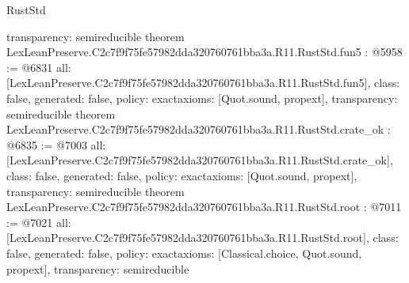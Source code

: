 \begin{lexlean}{RustStd}
\begin{coremodule}
{  transparency: semireducible
}
theorem LexLeanPreserve.C2c7f9f75fe57982dda320760761bba3a.R11.RustStd.fun5 : @5958 := @6831 {
  all: [LexLeanPreserve.C2c7f9f75fe57982dda320760761bba3a.R11.RustStd.fun5],
  class: false,
  generated: false,
  policy: exact{axioms: [Quot.sound, propext]},
  transparency: semireducible
}
theorem LexLeanPreserve.C2c7f9f75fe57982dda320760761bba3a.R11.RustStd.crate_ok : @6835 := @7003 {
  all: [LexLeanPreserve.C2c7f9f75fe57982dda320760761bba3a.R11.RustStd.crate_ok],
  class: false,
  generated: false,
  policy: exact{axioms: [Quot.sound, propext]},
  transparency: semireducible
}
theorem LexLeanPreserve.C2c7f9f75fe57982dda320760761bba3a.R11.RustStd.root : @7011 := @7021 {
  all: [LexLeanPreserve.C2c7f9f75fe57982dda320760761bba3a.R11.RustStd.root],
  class: false,
  generated: false,
  policy: exact{axioms: [Classical.choice, Quot.sound, propext]},
  transparency: semireducible
}


\end{coremodule}
\end{lexlean}
